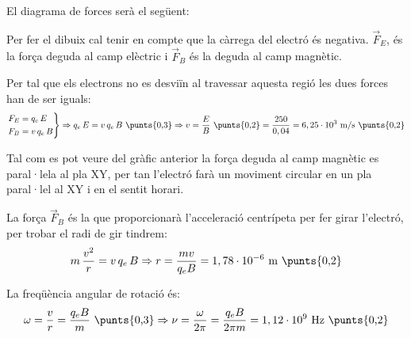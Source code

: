 \begin{solapartat}
El diagrama de forces serà el següent:

\noindent\begin{minipage}[c]{0.55\linewidth}
\end{minipage}\hfill
\begin{minipage}[c]{0.3\linewidth}
\end{minipage}\hfill
\begin{minipage}[c]{0.1\linewidth}
\end{minipage}

Per fer el dibuix cal tenir en compte que la càrrega del electró és negativa. $\vec{F}_E$, és la força deguda al camp elèctric i $\vec{F}_B$ és la deguda al camp magnètic.

Per tal que els electrons no es desviïn al travessar aquesta regió les dues forces han de ser iguals:
\[ \left.\begin{aligned} F_E &= q_e\,E\\ F_B &= v\,q_e\,B \end{aligned}\right\} \Rightarrow q_e\,E = v\,q_e\,B\ \text{\punts{0,3}} \Rightarrow v = \frac{E}{B}\ \text{\punts{0,2}} = \frac{250}{0,04} = 6,25\cdot 10^{3}\ \mathrm{m/s}\ \text{\punts{0,2}} \]
\end{solapartat}

\begin{solapartat}
Tal com es pot veure del gràfic anterior la força deguda al camp magnètic es paral·lela al pla XY, per tan l'electró farà un moviment circular en un pla paral·lel al XY  i en el sentit horari. 

La força $\vec{F}_B$ és la que proporcionarà l'acceleració centrípeta per fer girar l'electró, per trobar el radi de gir tindrem:
\[ m\,\frac{v^2}{r} = v\,q_e\,B \Rightarrow r = \frac{mv}{q_eB} = 1,78\cdot 10^{-6}\ \mathrm{m}\ \text{\punts{0,2}} \]

La freqüència angular de rotació és:
\[ \omega = \frac{v}{r} = \frac{q_eB}{m}\ \text{\punts{0,3}} \Rightarrow \nu = \frac{\omega}{2\pi} = \frac{q_eB}{2\pi m} = 1,12\cdot 10^{9}\ \mathrm{Hz}\ \text{\punts{0,2}} \]
\end{solapartat}
